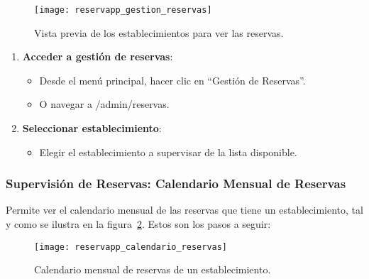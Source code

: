 \begin{figure}[H]
	\centering
		\texttt{[image: reservapp\_gestion\_reservas]}
	\caption{Vista previa de los establecimientos para ver las reservas.}
	\label{fig:reservapp_gestion_reservas}
\end{figure}

\begin{enumerate}
   \item \textbf{Acceder a gestión de reservas}:
   \begin{itemize}
      \item Desde el menú principal, hacer clic en ``Gestión de Reservas''.
      \item O navegar a /admin/reservas.
   \end{itemize}
   \item \textbf{Seleccionar establecimiento}:
   \begin{itemize}
      \item Elegir el establecimiento a supervisar de la lista disponible.
   \end{itemize}
\end{enumerate}

\subsubsection{Supervisión de Reservas: Calendario Mensual de Reservas}
Permite ver el calendario mensual de las reservas que tiene un establecimiento, tal y como se ilustra en la figura~\ref{fig:reservapp_calendario_reservas}. Estos son los pasos a seguir:

\begin{figure}[H]
	\centering
		\texttt{[image: reservapp\_calendario\_reservas]}
	\caption{Calendario mensual de reservas de un establecimiento.}
	\label{fig:reservapp_calendario_reservas}
\end{figure}

